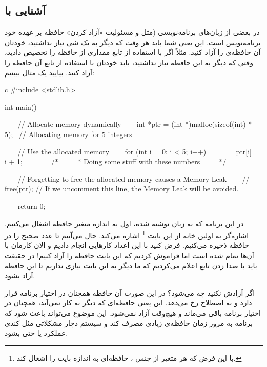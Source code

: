 \subsection{آشنایی با }

در بعضی از زبان‌های برنامه‌نویسی (مثل  و  مسئولیت «آزاد
کردن» حافظه بر عهده خود برنامه‌نویس است. این یعنی شما باید هر وقت که دیگر
به یک شی نیاز نداشتید، خودتان آن حافظه‌ی را آزاد کنید. مثلاً اگر با
استفاده از تابع  مقداری از حافظه را تخصیص
 دادید، وقتی که دیگر به این حافظه نیاز نداشتید، باید
خودتان با استفاده از تابع  آن حافظه را آزاد کنید.
بیایید یک مثال ببینیم:

\begin{codebox}{c}
#include <stdlib.h>

int main() {
    // Allocate memory dynamically
    int *ptr = (int *)malloc(sizeof(int) * 5);  // Allocating memory for 5 integers  
  
    // Use the allocated memory
    for (int i = 0; i < 5; i++) {  
        ptr[i] = i + 1;  
    }
    /*  
     * Doing some stuff with these numbers  
     */  
  
    // Forgetting to free the allocated memory causes a Memory Leak  
    // free(ptr); // If we uncomment this line, the Memory Leak will be avoided.

    return 0;  
}
\end{codebox}

در این برنامه که به زبان  نوشته شده، اول به اندازه
 متغیر  حافظه اشغال می‌کنیم. اشاره‌گر
 به اولین خانه از این  بایت \footnote{با
  این فرض که هر متغیر از جنس  ، حافظه‌ای به اندازه
   بایت را اشغال کند.} اشاره می‌کند. حال می‌آییم
 تا عدد صحیح را در حافظه ذخیره می‌کنیم. فرض کنید با این
اعداد کارهایی انجام دادیم و الان کارمان با آن‌ها تمام شده است اما فراموش
کردیم که این  بایت حافظه را آزاد کنیم! در حقیقت باید با
صدا زدن تابع  اعلام می‌کردیم که ما دیگر به این
 بایت نیازی نداریم تا این حافظه آزاد بشود.

اگر آزادش نکنید چه می‌شود؟ در این صورت آن حافظه همچنان در اختیار برنامه
قرار دارد و به اصطلاح  رخ می‌دهد. این یعنی حافظه‌ای که
دیگر به کار نمی‌آید، همچنان در اختیار برنامه باقی می‌ماند و هیچ‌وقت آزاد
نمی‌شود. این موضوع می‌تواند باعث شود که برنامه به مرور زمان حافظه‌ی زیادی
مصرف کند و سیستم دچار مشکلاتی مثل کندی عملکرد یا حتی  بشود.

